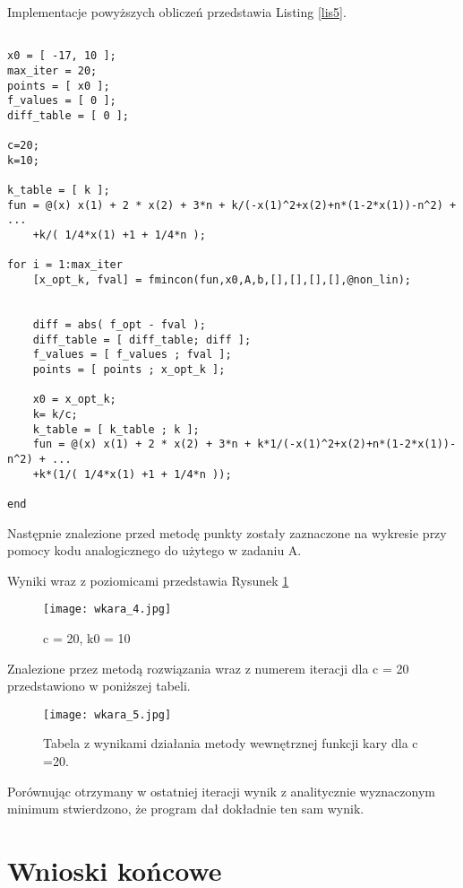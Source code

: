 \documentclass[a4paper,15pt]{article}
\begin{document}
Implementacje powyższych obliczeń przedstawia Listing \ref{lis5}.
\begin{lstlisting}[caption=Znalezienie minimum przy użyciu wewnętrznej funkcji kary, captionpos=b,label=lis5, firstnumber=12,frame=single]
% znalezienie minimum przy uzyciu wewnetrznej f. kary

x0 = [ -17, 10 ]; 
max_iter = 20;
points = [ x0 ];
f_values = [ 0 ];
diff_table = [ 0 ];

c=20;
k=10;

k_table = [ k ];
fun = @(x) x(1) + 2 * x(2) + 3*n + k/(-x(1)^2+x(2)+n*(1-2*x(1))-n^2) + ...
    +k/( 1/4*x(1) +1 + 1/4*n );

for i = 1:max_iter
    [x_opt_k, fval] = fmincon(fun,x0,A,b,[],[],[],[],@non_lin);
    
    
    diff = abs( f_opt - fval );
    diff_table = [ diff_table; diff ];
    f_values = [ f_values ; fval ];  
    points = [ points ; x_opt_k ];
    
    x0 = x_opt_k;
    k= k/c;
    k_table = [ k_table ; k ];
    fun = @(x) x(1) + 2 * x(2) + 3*n + k*1/(-x(1)^2+x(2)+n*(1-2*x(1))-n^2) + ...
    +k*(1/( 1/4*x(1) +1 + 1/4*n ));

end

\end{lstlisting}

Następnie znalezione przed metodę punkty zostały zaznaczone na wykresie przy pomocy kodu analogicznego do użytego w zadaniu A.

Wyniki wraz z poziomicami przedstawia Rysunek \ref{fig:wkara_4}

\begin{figure}[H]
\centerline{\texttt{[image: wkara\_4.jpg]}}
\caption{c = 20, k0 = 10}
\label{fig:wkara_4}

\end{figure}

Znalezione przez metodą rozwiązania wraz z numerem iteracji dla c = 20 przedstawiono w poniższej tabeli.  
\begin{figure}[H]
\centerline{\texttt{[image: wkara\_5.jpg]}}
\centering
\caption{Tabela z wynikami działania metody wewnętrznej funkcji kary dla c =20.}
\label{fig:wkara_5}
\end{figure}

Porównując otrzymany w ostatniej iteracji wynik z analitycznie wyznaczonym minimum stwierdzono, że program dał dokładnie ten sam wynik.
 

\section{Wnioski końcowe}
\end{document}
